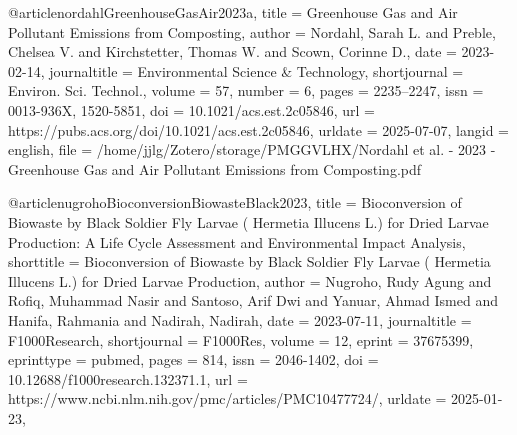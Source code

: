 {{{{@article{nordahlGreenhouseGasAir2023a,
  title = {Greenhouse {{Gas}} and {{Air Pollutant Emissions}} from {{Composting}}},
  author = {Nordahl, Sarah L. and Preble, Chelsea V. and Kirchstetter, Thomas W. and Scown, Corinne D.},
  date = {2023-02-14},
  journaltitle = {Environmental Science \& Technology},
  shortjournal = {Environ. Sci. Technol.},
  volume = {57},
  number = {6},
  pages = {2235--2247},
  issn = {0013-936X, 1520-5851},
  doi = {10.1021/acs.est.2c05846},
  url = {https://pubs.acs.org/doi/10.1021/acs.est.2c05846},
  urldate = {2025-07-07},
  langid = {english},
  file = {/home/jjlg/Zotero/storage/PMGGVLHX/Nordahl et al. - 2023 - Greenhouse Gas and Air Pollutant Emissions from Composting.pdf}
}

@article{nugrohoBioconversionBiowasteBlack2023,
  title = {Bioconversion of Biowaste by Black Soldier Fly Larvae ( {{Hermetia}} Illucens {{L}}.) for Dried Larvae Production: {{A}} Life Cycle Assessment and Environmental Impact Analysis},
  shorttitle = {Bioconversion of Biowaste by Black Soldier Fly Larvae ( {{Hermetia}} Illucens {{L}}.) for Dried Larvae Production},
  author = {Nugroho, Rudy Agung and Rofiq, Muhammad Nasir and Santoso, Arif Dwi and Yanuar, Ahmad Ismed and Hanifa, Rahmania and Nadirah, Nadirah},
  date = {2023-07-11},
  journaltitle = {F1000Research},
  shortjournal = {F1000Res},
  volume = {12},
  eprint = {37675399},
  eprinttype = {pubmed},
  pages = {814},
  issn = {2046-1402},
  doi = {10.12688/f1000research.132371.1},
  url = {https://www.ncbi.nlm.nih.gov/pmc/articles/PMC10477724/},
  urldate = {2025-01-23},
}}}}}
